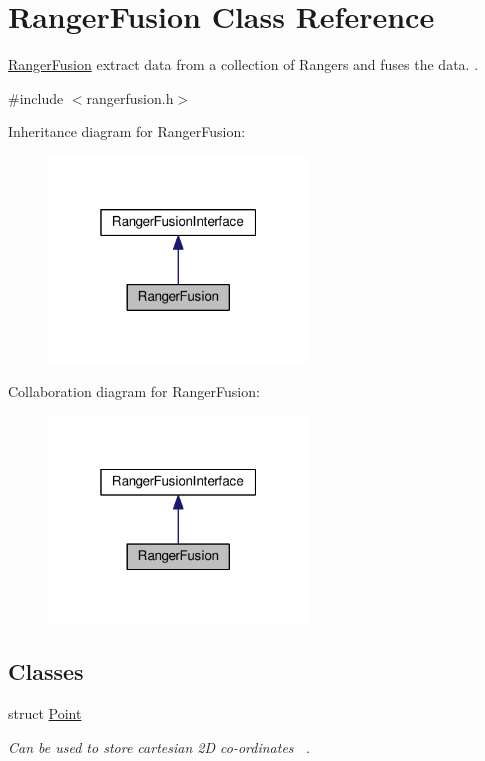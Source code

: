 \hypertarget{class_ranger_fusion}{}\section{Ranger\+Fusion Class Reference}
\label{class_ranger_fusion}


\hyperlink{class_ranger_fusion}{Ranger\+Fusion} extract data from a collection of Rangers and fuses the data. .  




{\ttfamily \#include $<$rangerfusion.\+h$>$}



Inheritance diagram for Ranger\+Fusion\+:
\nopagebreak
\begin{figure}[H]
\begin{center}
\leavevmode
\includegraphics[width=196pt]{class_ranger_fusion__inherit__graph}
\end{center}
\end{figure}


Collaboration diagram for Ranger\+Fusion\+:
\nopagebreak
\begin{figure}[H]
\begin{center}
\leavevmode
\includegraphics[width=196pt]{class_ranger_fusion__coll__graph}
\end{center}
\end{figure}
\subsection*{Classes}
\begin{DoxyCompactItemize}
\item 
struct \hyperlink{struct_ranger_fusion_1_1_point}{Point}
\begin{DoxyCompactList}\small\item\em Can be used to store cartesian 2D co-\/ordinates~\newline
. \end{DoxyCompactList}\end{DoxyCompactItemize}
